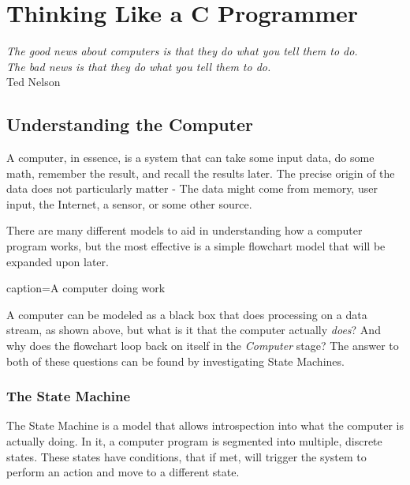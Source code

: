 \documentclass[../main.tex]{subfiles}
\begin{document}
\chapter{Thinking Like a C Programmer}

\vspace{0.2cm}
\begin{center}
	\textit{
		The good news about computers is that they do what you tell them to do.\\
		The bad news is that they do what you tell them to do.
	}\\\vspace{0.5cm}
	Ted Nelson
\end{center}
\vspace{0.75cm}

\section{Understanding the Computer}
A computer, in essence, is a system that can take some input data, do some math,
remember the result, and recall the results later. The precise origin of the data
does not particularly matter - The data might come from memory, user input,
the Internet, a sensor, or some other source.

There are many different models to aid in understanding how a computer program works,
but the most effective is a simple flowchart model that will be expanded upon later.

\begin{obifig}{caption=A computer doing work}
\end{obifig}

A computer can be modeled as a black box that does processing on a data stream,
as shown above, but what is it that the computer actually \textit{does}? And why does
the flowchart loop back on itself in the \textit{Computer} stage? The answer to both of these questions can be found by investigating State Machines.

\subsection{The State Machine}
The State Machine is a model that allows introspection into what the computer is
actually doing. In it, a computer program is segmented into multiple, discrete
states. These states have conditions, that if met, will trigger the system to perform
an action and move to a different state.
\end{document}
